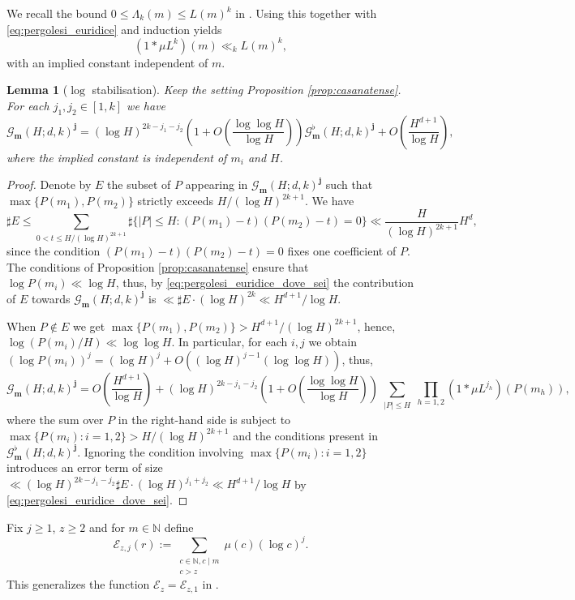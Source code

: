 \documentclass[reqno, 11pt]{amsart}
\numberwithin{equation}{section}
\newtheorem{lemma}[theorem]{Lemma}
\theoremstyle{definition}
\newcommand{\0}{\mathbf{0}}
\renewcommand{\leq}{\leqslant}
\renewcommand{\geq}{\geqslant}
\renewcommand{\b}{\mathbf{b}}
\renewcommand{\b}{\mathbf}
\renewcommand{\c}{\mathcal}
\renewcommand{\leq}{\leqslant}
\renewcommand{\geq}{\geqslant}
\renewcommand{\#}{\sharp}
\begin{document}
We recall the  bound $ 0\leq \Lambda_k(m)\leq L(m)^k$ in \cite[Equation (3.16)]{MR2647984}.
Using this together with \eqref{eq:pergolesi_euridice} and induction  yields \begin{equation}
\label{eq:pergolesi_euridice_dove_sei} (1\ast \mu L^{k})(m) \ll_k L(m)^k 
,\end{equation}with an implied constant independent of $m$. \begin{lemma}[$\log$ stabilisation]
\label{lem:stabilisation} Keep the setting  Proposition \ref{prop:casanatense}. For each $j_1,j_2\in [1,k]$ we have $$
\mathcal G_{\mathbf m}(H;d,k)^{\b j}= (\log H)^{2k-j_1-j_2} \left( 1 +O\left( \frac{\log \log H}{\log H}\right)\right)
\mathcal G^\flat_{\b m}(H;d,k)^{\b j} +O\left(\frac{H^{d+1}}{\log H}\right),$$ where the implied constant is independent of $m_i$ and $H$.
\end{lemma}  \begin{proof}Denote by $E$ the subset of $P$  appearing in  $\mathcal G_{\mathbf m}(H;d,k)^{\mathbf j}$
such that  $\max\{P(m_1),P(m_2)\}$ strictly  exceeds $ H/(\log H)^{2k+1}$. We have  
$$\#E\leq \sum_{0<t\leq H/(\log H)^{2k+1}} \#\{|P|\leq H: (P(m_1)-t)(P(m_2)-t)=0\}
\ll  \frac{H}{(\log H)^{2k+1}}H^d,$$ since the condition $(P(m_1)-t)(P(m_2)-t)=0$ fixes one coefficient of $P$.
The conditions of Proposition \ref{prop:casanatense} ensure that $\log P(m_i)\ll \log H$, thus,  
by \eqref{eq:pergolesi_euridice_dove_sei} the contribution of $E$ towards  $\mathcal G_{\mathbf m }(H;d,k)^{\b j}$ is 
$ \ll  \#E \cdot (\log H)^{2k} \ll  H^{d+1}/\log H$.

When $P\notin E$ we get  $\max\{P(m_1), P(m_2)\} > H^{d+1}/(\log H)^{2k+1}$, hence,  $ \log (P(m_i)/H) \ll \log \log H$. In particular, 
for each $i,j $ we obtain    $ (\log P(m_i))^j =(\log H)^j +O((\log H)^{j-1}(\log \log H))$, thus,
$$ \mathcal G_{\mathbf m}(H;d,k)^{\mathbf j}= O\left(\frac{H^{d+1}}{\log H}\right)+
(\log H)^{2k-j_1-j_2} \left( 1 +O\left( \frac{\log \log H}{\log H}\right)\right)
\sum_{  \substack{ |P|\leq H  } } \prod_{h=1,2}  (1\ast \mu L^{j_h})(P(m_h)) 
,$$ where the sum over $P$ in the right-hand side  is subject to    $\max\{P(m_i):i=1,2\}> 
H/(\log H)^{2k+1}$ and the conditions present  in $\mathcal G^\flat_{\mathbf m}(H;d,k)^{\mathbf j}$.
Ignoring the condition  involving  $\max\{P(m_i):i=1,2\}$  introduces an error term  of size 
 $ \ll  (\log H)^{2k-j_1-j_2} \#E \cdot (\log H)^{j_1+j_2} \ll H^{d+1}/\log H $ by \eqref{eq:pergolesi_euridice_dove_sei}. \end{proof}
Fix $j\geq 1 $, $z\geq 2 $ and for $m\in \mathbb N$  define  $$\c E_{z,j}(r):=\sum_{\substack{c\in \mathbb N, c\mid m \\ c>z } } 
\mu(c) (\log c)^j.$$ This generalizes the function  $\mathcal E_{z}=\mathcal E_{z,1}$ in \cite[page 691]{MR4542704}.
\end{document}
